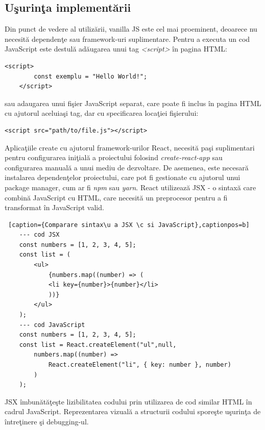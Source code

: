 \documentclass[12pt, a4paper]{report}
\begin{document}
\subsection{U\c surin\c ta implement\u arii}
Din punct de vedere al utiliz\u arii, vanilla JS este cel mai proeminent, deoarece nu necesit\u a dependen\c te sau framework-uri suplimentare. Pentru a executa un cod JavaScript este destul\u a ad\u augarea unui tag \textit{\textless script\textgreater }   \^ in pagina HTML:
\begin{lstlisting}[caption={Exemplu de ad\u augare a unui script \^ in pagina HTML},captionpos=b]
	<script>
		const exemplu = "Hello World!";
	</script>
	\end{lstlisting}

sau adaugarea unui fi\c sier JavaScript separat, care poate fi inclus \^ in pagina HTML cu ajutorul aceluia\c si tag, dar cu specificarea loca\c tiei fi\c sierului:

\begin{lstlisting}[caption={Exemplu de ad\u augare a unui script dintr-un fi\c sier extern},captionpos=b]
	<script src="path/to/file.js"></script>
\end{lstlisting}

Aplica\c tiile create cu ajutorul framework-urilor React, necesit\u a pa\c si suplimentari pentru configurarea ini\c tial\u a a proiectului folosind \textit{create-react-app} sau configurarea manual\u a a unui mediu de dezvoltare. De asemenea, este necesar\u a instalarea dependen\c telor proiectului, care pot fi gestionate cu ajutorul unui package manager, cum ar fi \textit{npm} sau \textit{yarn}. React utilizeaz\u a JSX - o sintax\u a care combin\u a JavaScript cu HTML, care necesit\u a un preprocesor pentru a fi transformat \^in JavaScript valid.

\begin{lstlisting} [caption={Comparare sintax\u a JSX \c si JavaScript},captionpos=b]
	--- cod JSX
	const numbers = [1, 2, 3, 4, 5];
	const list = (
		<ul>
			{numbers.map((number) => (
			<li key={number}>{number}</li>
			))}
		</ul>
	);
	--- cod JavaScript
	const numbers = [1, 2, 3, 4, 5];
	const list = React.createElement("ul",null,
		numbers.map((number) =>
			React.createElement("li", { key: number }, number)
		)
	);

\end{lstlisting}

JSX \^imbun\u at\u a\c te\c ste lizibilitatea codului prin utilizarea de cod similar HTML \^in cadrul JavaScript. Reprezentarea vizual\u a a structurii codului spore\c ste u\c surin\c ta de \^intre\c tinere \c si debugging-ul.
\end{document}
